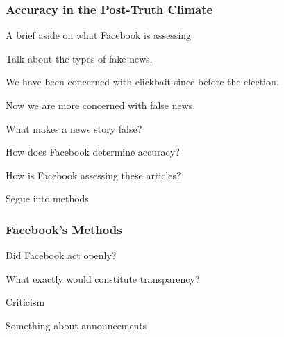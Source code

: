
\subsubsection{Accuracy in the Post-Truth Climate}

\par A brief aside on what Facebook is assessing


\par Talk about the types of fake news. \cite{ted_becka}

\par We have been concerned with clickbait since before the election.

\par Now we are more concerned with false news.


\par What makes a news story false?

\par How does Facebook determine accuracy? \cite{tc_ban}


\par How is Facebook assessing these articles?

\par Segue into methods

\subsubsection{Facebook's Methods}

\par Did Facebook act openly?


\par What exactly would constitute transparency?

\par Criticism

\par Something about announcements \cite{fb_hoaxes_2015}

